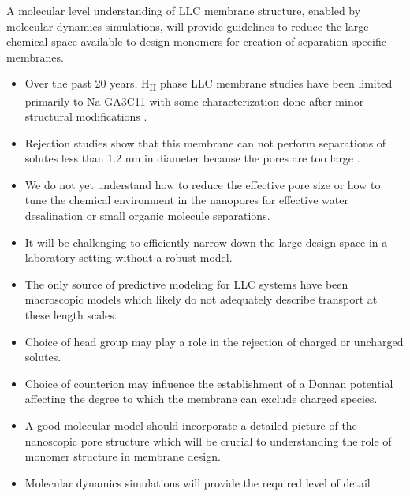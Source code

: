\documentclass{article}
\begin{document}
  A molecular level understanding of LLC membrane structure, enabled by molecular
  dynamics simulations, will provide guidelines to reduce the large chemical space
  available to design monomers for creation of separation-specific membranes.
  \begin{itemize}
    \item Over the past 20 years, H\textsubscript{II} phase LLC membrane studies have been limited primarily
    to Na-GA3C11 with some characterization done after minor structural modifications
    \cite{resel_structural_2000}.
    \item Rejection studies show that this membrane can not perform separations of
    solutes less than 1.2 nm in diameter because the pores are too large \cite{zhou_supported_2005}.
    \item  We do not yet understand how to reduce the effective pore size or 
    how to tune the chemical environment in the nanopores for effective water
    desalination or small organic molecule separations.
    \item It will be challenging to efficiently narrow down the large design space in 
    a laboratory setting without a robust model.
    \item The only source of predictive modeling for LLC systems have been macroscopic models 
    which likely do not adequately describe transport at these length scales. %
    \item Choice of head group may play a role in the rejection of charged or uncharged solutes.
    \item Choice of counterion may influence the establishment of a Donnan potential
    affecting the degree to which the membrane can exclude charged species.
    \item A good molecular model should incorporate a detailed picture of the nanoscopic pore 
    structure which will be crucial to understanding the role of monomer structure in 
    membrane design.
    \item Molecular dynamics simulations will provide the required level of detail
  \end{itemize}
\end{document}
